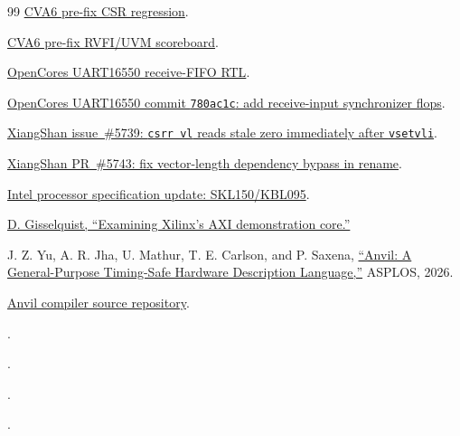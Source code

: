\documentclass[conference]{IEEEtran}
\begin{document}
\begin{thebibliography}{99}
\href{https://github.com/openhwfoundation/cva6/blob/67dba2cad376de0190bb5564f1e229de73e86ef1/verif/regress/dv-riscv-csr-access-test.sh}{CVA6 pre-fix CSR regression}.

\href{https://github.com/openhwfoundation/cva6/blob/67dba2cad376de0190bb5564f1e229de73e86ef1/verif/env/uvme/uvme_cva6_sb.sv}{CVA6 pre-fix RVFI/UVM scoreboard}.

\href{https://github.com/freecores/uart16550/blob/master/rtl/verilog/uart_regs.v}{OpenCores UART16550 receive-FIFO RTL}.

\href{https://github.com/freecores/uart16550/commit/780ac1c1252506fe719f306f6c30364a8b1e01eb}{OpenCores UART16550 commit \texttt{780ac1c}: add receive-input synchronizer flops}.

\href{https://github.com/OpenXiangShan/XiangShan/issues/5739}{XiangShan issue~\#5739: \texttt{csrr vl} reads stale zero immediately after \texttt{vsetvli}}.

\href{https://github.com/OpenXiangShan/XiangShan/pull/5743}{XiangShan PR~\#5743: fix vector-length dependency bypass in rename}.

\href{https://www.intel.com/content/www/us/en/content-details/334408/}{Intel processor specification update: SKL150/KBL095}.

\href{https://zipcpu.com/formal/2019/05/13/axifull.html}{D. Gisselquist,
``Examining Xilinx's AXI demonstration core.''}

J. Z. Yu, A. R. Jha, U. Mathur, T. E. Carlson, and P. Saxena,
\href{https://arxiv.org/abs/2503.19447}{``Anvil: A General-Purpose Timing-Safe Hardware Description Language,''}
ASPLOS, 2026.

\href{https://github.com/AnvilHDL/anvil}{Anvil compiler source repository}.

\href{run:../src/bug1/rtl/buggy.sv}{}.

\href{run:../src/bug1/rtl/buggy.anvil}{}.

\href{run:../src/bug1/rtl/fixed.sv}{}.

\href{run:../src/bug1/rtl/fixed.anvil}{}.


\end{thebibliography}
\end{document}
